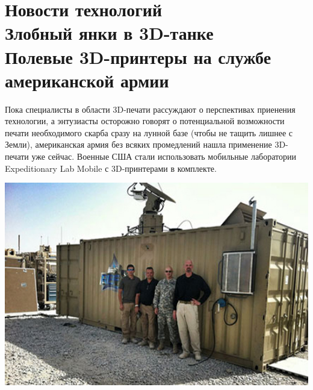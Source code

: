 \documentclass{magazine}
\begin{document}
\section{Новости технологий\\Злобный янки в
3D-танке\\Полевые 3D-принтеры на службе американской армии}
\begin{multicols}{2}

Пока специалисты в области 3D-печати рассуждают о перспективах приенения
технологии, а энтузиасты осторожно говорят о потенциальной возможности печати
необходимого скарба сразу на лунной базе (чтобы не тащить лишнее с Земли),
американская армия без всяких промедлений нашла применение 3D-печати уже сейчас.
Военные США стали использовать мобильные лаборатории Expeditionary Lab Mobile с
3D-принтерами в комплекте.

\end{multicols}
\noindent\includegraphics[width=\textwidth]{fig/00/01.jpg}
\end{document}
